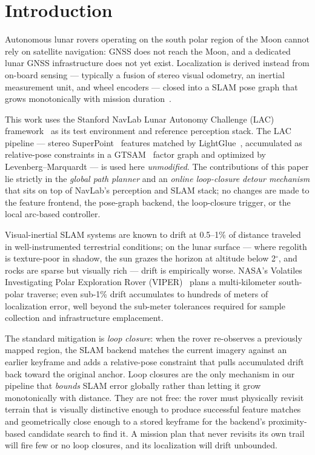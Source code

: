 \documentclass[letterpaper,times]{IONconf}
\begin{document}
\section{Introduction}

Autonomous lunar rovers operating on the south polar region of the Moon cannot rely on satellite navigation: GNSS does not reach the Moon, and a dedicated lunar GNSS infrastructure does not yet exist. Localization is derived instead from on-board sensing --- typically a fusion of stereo visual odometry, an inertial measurement unit, and wheel encoders --- closed into a SLAM pose graph that grows monotonically with mission duration~\citep{campos2021orbslam3, qin2018vins}.

This work uses the Stanford NavLab Lunar Autonomy Challenge (LAC) framework~\citep{stanford_navlab_lac} as its test environment and reference perception stack. The LAC pipeline --- stereo SuperPoint~\citep{detone2018superpoint} features matched by LightGlue~\citep{lindenberger2023lightglue}, accumulated as relative-pose constraints in a GTSAM~\citep{dellaert2012gtsam} factor graph and optimized by Levenberg--Marquardt --- is used here \emph{unmodified}. The contributions of this paper lie strictly in the \emph{global path planner} and an \emph{online loop-closure detour mechanism} that sits on top of NavLab's perception and SLAM stack; no changes are made to the feature frontend, the pose-graph backend, the loop-closure trigger, or the local arc-based controller.

Visual-inertial SLAM systems are known to drift at 0.5--1\% of distance traveled in well-instrumented terrestrial conditions; on the lunar surface --- where regolith is texture-poor in shadow, the sun grazes the horizon at altitude below 2$^\circ$, and rocks are sparse but visually rich --- drift is empirically worse. NASA's Volatiles Investigating Polar Exploration Rover (VIPER)~\citep{nasa2022viper} plans a multi-kilometer south-polar traverse; even sub-1\% drift accumulates to hundreds of meters of localization error, well beyond the sub-meter tolerances required for sample collection and infrastructure emplacement.

The standard mitigation is \emph{loop closure}: when the rover re-observes a previously mapped region, the SLAM backend matches the current imagery against an earlier keyframe and adds a relative-pose constraint that pulls accumulated drift back toward the original anchor. Loop closures are the only mechanism in our pipeline that \emph{bounds} SLAM error globally rather than letting it grow monotonically with distance. They are not free: the rover must physically revisit terrain that is visually distinctive enough to produce successful feature matches and geometrically close enough to a stored keyframe for the backend's proximity-based candidate search to find it. A mission plan that never revisits its own trail will fire few or no loop closures, and its localization will drift unbounded.
\end{document}
